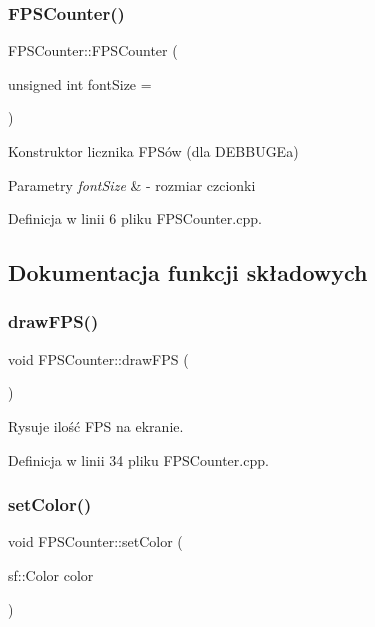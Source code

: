\subsubsection{\texorpdfstring{F\+P\+S\+Counter()}{FPSCounter()}}
{\footnotesize\ttfamily F\+P\+S\+Counter\+::\+F\+P\+S\+Counter (\begin{DoxyParamCaption}\item[{unsigned int}]{font\+Size = {} }\end{DoxyParamCaption})}

Konstruktor licznika F\+PS\textquotesingle{}ów (dla D\+E\+B\+B\+U\+GE\textquotesingle{}a)


\begin{DoxyParams}{Parametry}
{\em font\+Size} & -\/ rozmiar czcionki \\
\hline
\end{DoxyParams}


Definicja w linii 6 pliku F\+P\+S\+Counter.\+cpp.



\subsection{Dokumentacja funkcji składowych}
\mbox{\label{class_f_p_s_counter_a7415ae4bb4094b4809627caf5e40d8f1}} 
\subsubsection{\texorpdfstring{draw\+F\+P\+S()}{drawFPS()}}
{\footnotesize\ttfamily void F\+P\+S\+Counter\+::draw\+F\+PS (\begin{DoxyParamCaption}{ }\end{DoxyParamCaption})}



Rysuje ilość F\+PS na ekranie. 



Definicja w linii 34 pliku F\+P\+S\+Counter.\+cpp.

\mbox{\label{class_f_p_s_counter_a57be5e95f140cb230f3f4e11ca476857}} 
\subsubsection{\texorpdfstring{set\+Color()}{setColor()}}
{\footnotesize\ttfamily void F\+P\+S\+Counter\+::set\+Color (\begin{DoxyParamCaption}\item[{sf\+::\+Color}]{color }\end{DoxyParamCaption})}



